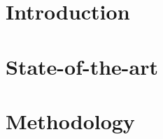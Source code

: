 
\section{Introduction}
\label{sec:introduction}



\section{State-of-the-art}
\label{sec:state-of-the-art}

%
% 


\section{Methodology}
\label{sec:methodology}



